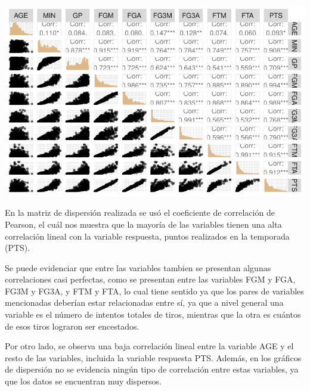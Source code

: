\documentclass[
  letterpaper,
  DIV=11,
  numbers=noendperiod]{scrartcl}
\newenvironment{Shaded}{\begin{snugshade}}{\end{snugshade}}
\newcommand{\AttributeTok}[1]{\textcolor[rgb]{0.40,0.45,0.13}{#1}}
\newcommand{\CommentTok}[1]{\textcolor[rgb]{0.37,0.37,0.37}{#1}}
\newcommand{\FunctionTok}[1]{\textcolor[rgb]{0.28,0.35,0.67}{#1}}
\newcommand{\NormalTok}[1]{\textcolor[rgb]{0.00,0.23,0.31}{#1}}
\newcommand{\OtherTok}[1]{\textcolor[rgb]{0.00,0.23,0.31}{#1}}
\newcommand{\SpecialCharTok}[1]{\textcolor[rgb]{0.37,0.37,0.37}{#1}}
\begin{document}
\includegraphics[width=1\textwidth,height=\textheight]{Modelos_files/figure-pdf/unnamed-chunk-4-1.pdf}

En la matriz de dispersión realizada se usó el coeficiente de
correlación de Pearson, el cuál nos muestra que la mayoría de las
variables tienen una alta correlación lineal con la variable respuesta,
puntos realizados en la temporada (PTS).

Se puede evidenciar que entre las variables tambien se presentan algunas
correlaciones casi perfectas, como se presentan entre las variables FGM
y FGA, FG3M y FG3A, y FTM y FTA, lo cual tiene sentido ya que los pares
de variables mencionadas deberían estar relacionadas entre sí, ya que a
nivel general una variable es el número de intentos totales de tiros,
mientras que la otra es cuántos de esos tiros lograron ser encestados.

Por otro lado, se observa una baja correlación lineal entre la variable
AGE y el resto de las variables, incluida la variable respuesta PTS.
Además, en los gráficos de dispersión no se evidencia ningún tipo de
correlación entre estas variables, ya que los datos se encuentran muy
dispersos.

\begin{Shaded}
\end{Shaded}
\end{document}

